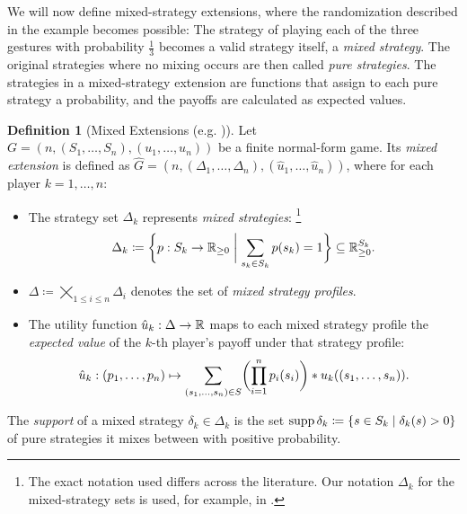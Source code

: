 \documentclass[a4paper,DIV=11]{scrreprt}
\newcommand{\Rp}{\mathbb{R}_{\geq 0}}
\theoremstyle{definition}
\newtheorem{defn}[thm]{Definition} %
\begin{document}
    We will now define mixed-strategy extensions, where the randomization described in the example becomes possible: The strategy of playing each of the three gestures with probability $\frac{1}{3}$ becomes a valid strategy itself, a \emph{mixed strategy}. The original strategies where no mixing occurs are then called \emph{pure strategies}. The strategies in a mixed-strategy extension are functions that assign to each pure strategy a probability, and the payoffs are calculated as expected values.

    \begin{defn}[Mixed Extensions (e.g. \cite{bib:matsumotoGameTheory})]
        Let $G = (n{,}(S_1{,\dots,}S_n){, }(u_1{,\dots,}u_n))$ be a finite normal-form game.
        Its \emph{mixed extension} is defined as $\hat{G} = (n, (\Delta_1, \dots, \Delta_n), (\hat{u}_1, \dots, \hat{u}_n))$,
        where for each player $k = 1,\dots,n$:
        \begin{itemize}
            \item 
            The strategy set $\Delta_k$ represents \emph{mixed strategies}:
            \footnote{The exact notation used differs across the literature. Our notation $\Delta_k$ for the mixed-strategy sets is used, for example, in \cite{bib:quantPropernessProtectiveness}.}
            \begin{gather*} 
                \Delta_k \coloneqq \biggset{ p : S_k \to \Rp \biggmid \sum_{s_k \in S_k} p(s_k) = 1 } \subseteq \Rp^{S_k}.
            \end{gather*} 
            
            \item $\Delta \coloneqq \bigtimes\limits_{1\leq i \leq n} \Delta_i$ denotes the set of \emph{mixed strategy profiles}.
            
            \item
            The utility function $\hat{u}_k: \Delta \to \mathbb{R}$ maps to each mixed strategy profile the \emph{expected value} of the $k$-th player's payoff under that strategy profile:
            \begin{gather}
                \hat{u}_k: 
                (p_1, \dots, p_n) 
                \mapsto
                \sum_{(s_1, \dots, s_n) \in S} \biggl(\prod_{i=1}^{n} p_i(s_i)\biggr) * u_k( (s_1, \dots, s_n) ).
                \label{eq:mixedStrategyUtility}
            \end{gather}
        \end{itemize}
        The \emph{support} of a mixed strategy $\delta_k \in \Delta_k$  is the set $\operatorname{supp} \delta_k \coloneqq \{s \in S_k \mid \delta_k(s) > 0\}$ of pure strategies it mixes between with positive probability.
    \end{defn}
\end{document}
